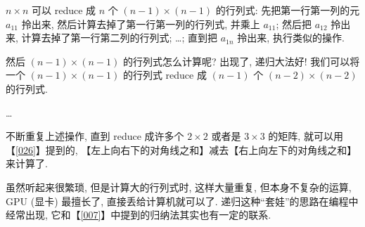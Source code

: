 \(n\times n\) 可以 reduce 成 \(n\) 个 \((n-1)\times(n-1)\) 的行列式:
先把第一行第一列的元 \(a_{11}\) 拎出来,
然后计算去掉了第一行第一列的行列式, 并乘上 \(a_{11}\); 然后把 \(a_{12}\)
拎出来, 计算去掉了第一行第二列的行列式; \ldots; 直到把 \(a_{1n}\)
拎出来, 执行类似的操作.

然后 \((n-1)\times(n-1)\) 的行列式怎么计算呢? 出现了, 递归大法好!
我们可以将一个 \((n-1)\times(n-1)\) 的行列式 reduce 成 \((n-1)\) 个
\((n-2)\times(n-2)\) 的行列式.

\ldots{}

不断重复上述操作, 直到 reduce 成许多个 \(2\times2\) 或者是 \(3\times3\)
的矩阵, 就可以用【\ref{026}】提到的,
【左上向右下的对角线之和】减去【右上向左下的对角线之和】来计算了.

虽然听起来很繁琐, 但是计算大的行列式时, 这样大量重复,
但本身不复杂的运算, GPU (显卡) 最擅长了, 直接丢给计算机就可以了.
递归这种``套娃''的思路在编程中经常出现,
它和【\ref{007}】中提到的归纳法其实也有一定的联系.
